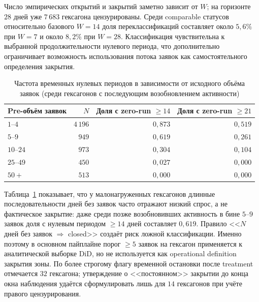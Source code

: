 \documentclass[14pt,a4paper]{extarticle}
\begin{document}
Число эмпирических открытий и закрытий заметно зависит от \(W\); на горизонте \(28\) дней уже \(7\,683\) гексагона цензурированы. Среди comparable статусов относительно базового \(W=14\) доля переклассификаций составляет около \(5{,}6\%\) при \(W=7\) и около \(8{,}2\%\) при \(W=28\). Классификация чувствительна к выбранной продолжительности нулевого периода, что дополнительно ограничивает возможность использования потока заявок как самостоятельного определения закрытия.

\begin{table}[H]
    \centering
    \caption{Частота временных нулевых периодов в зависимости от исходного
    объёма заявок (среди гексагонов с последующим возобновлением активности)}
    \label{tab:hex-close-low-demand}
    \small
    \begin{tabular}{lrrr}
        \toprule
        Pre-объём заявок
        & \(N\)
        & Доля с zero-run \(\geq 14\)
        & Доля с zero-run \(\geq 21\) \\
        \midrule
        \(1\)--\(4\)   & \(4\,196\) & \(0{,}873\) & \(0{,}519\) \\
        \(5\)--\(9\)   & \(949\)   & \(0{,}619\) & \(0{,}261\) \\
        \(10\)--\(24\) & \(973\)   & \(0{,}304\) & \(0{,}104\) \\
        \(25\)--\(49\) & \(450\)   & \(0{,}027\) & \(0{,}000\) \\
        \(50+\)        & \(513\)   & \(0{,}000\) & \(0{,}000\) \\
        \bottomrule
    \end{tabular}
\end{table}

Таблица~\ref{tab:hex-close-low-demand} показывает, что у малонагруженных гексагонов длинные последовательности дней без заявок часто отражают низкий спрос, а не фактическое закрытие: даже среди позже возобновивших активность в бине \(5\)--\(9\) заявок доля с нулевым периодом \(\geq 14\) дней составляет \(0{,}619\). Правило <<\(N\) дней без заявок \(\Rightarrow\) closed>> создаёт риск ложной классификации. Именно поэтому в основном пайплайне порог \(\geq 5\) заявок на гексагон применяется к аналитической выборке DiD, но не используется как operational definition закрытия зоны. По более строгому флагу временной остановки после treatment отмечается \(32\) гексагона; утверждение о <<постоянном>> закрытии до конца окна наблюдения удаётся сформулировать лишь для \(14\) гексагонов при учёте правого цензурирования.
\end{document}
